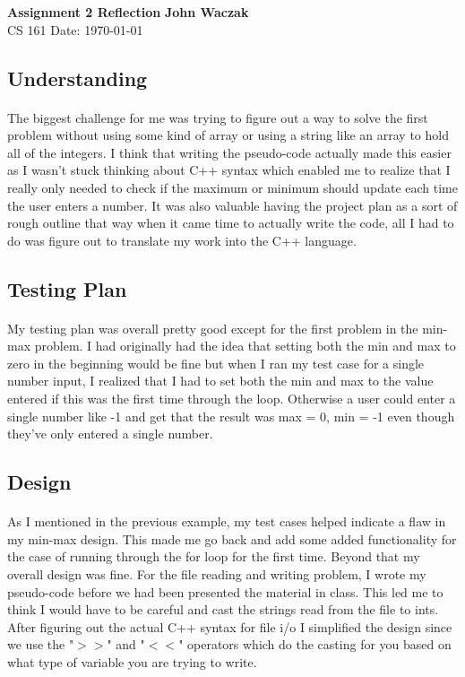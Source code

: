 \documentclass[a4paper, 11pt]{article}
\begin{document}
\noindent
\large\textbf{Assignment 2 Reflection} \hfill \textbf{John Waczak} \\
\normalsize CS 161 \hfill  Date: \today \\

\subsection*{Understanding}
	\paragraph{}
	The biggest challenge for me was trying to figure out a way to solve the first problem without using some kind of array or using a string like an array to hold all of the integers. I think that writing the pseudo-code actually made this easier as I wasn't stuck thinking about C++ syntax which enabled me to realize that I really only needed to check if the maximum or minimum should update each time the user enters a number. It was also valuable having the project plan as a sort of rough outline that way when it came time to actually write the code, all I had to do was figure out to translate my work into the C++ language. 
	
\subsection*{Testing Plan}
	\paragraph{}
	My testing plan was overall pretty good except for the first problem in the min-max problem. I had originally had the idea that setting both the min and max to zero in the beginning would be fine but when I ran my test case for a single number input, I realized that I had to set both the min and max to the value entered if this was the first time through the loop. Otherwise a user could enter a single number like -1 and get that the result was max = 0, min = -1 even though they've only entered a single number. 
\subsection*{Design}
	\paragraph{}
	As I mentioned in the previous example, my test cases helped indicate a flaw in my min-max design. This made me go back and add some added functionality for the case of running through the for loop for the first time. Beyond that my overall design was fine. For the file reading and writing problem, I wrote my pseudo-code before we had been presented the material in class. This led me to think I would have to be careful and cast the strings read from the file to ints. After figuring out the actual C++ syntax for file i/o I simplified the design since we use the "$>>$" and "$<<$" operators which do the casting for you based on what type of variable you are trying to write.  
\end{document}
